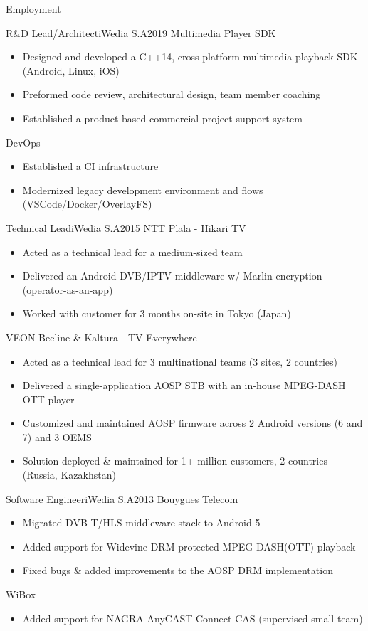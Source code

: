 \documentclass[]{mcdowellcv}
\begin{document}
\begin{cvsection}{Employment}
		\begin{cvsubsection}{R\&D Lead/Architect}{iWedia S.A}{2019}
			Multimedia Player SDK
			\begin{itemize}
				\item Designed and developed a C++14, cross-platform multimedia playback SDK (Android, Linux, iOS)
				\item Preformed code review, architectural design, team member coaching
				\item Established a product-based commercial project support system
			\end{itemize}
			DevOps
			\begin{itemize}
				\item Established a CI infrastructure
				\item Modernized legacy development environment and flows (VSCode/Docker/OverlayFS)
			\end{itemize}
		\end{cvsubsection}

		\begin{cvsubsection}{Technical Lead}{iWedia S.A}{2015}
			NTT Plala - Hikari TV
			\begin{itemize}
				\item Acted as a technical lead for a medium-sized team
				\item Delivered an Android DVB/IPTV middleware w/ Marlin encryption (operator-as-an-app)
				\item Worked with customer for 3 months on-site in Tokyo (Japan)
			\end{itemize}
			VEON Beeline \& Kaltura - TV Everywhere
			\begin{itemize}
				\item Acted as a technical lead for 3 multinational teams (3 sites, 2 countries)
				\item Delivered a single-application AOSP STB with an in-house MPEG-DASH OTT player
				\item Customized and maintained AOSP firmware across 2 Android versions (6 and 7) and 3 OEMS
				\item Solution deployed \& maintained for 1+ million customers, 2 countries (Russia, Kazakhstan)
			\end{itemize}
		\end{cvsubsection}

		\begin{cvsubsection}{Software Engineer}{iWedia S.A}{2013}
			Bouygues Telecom
			\begin{itemize}
				\item Migrated DVB-T/HLS middleware stack to Android 5
				\item Added support for Widevine DRM-protected MPEG-DASH(OTT) playback
				\item Fixed bugs \& added improvements to the AOSP DRM implementation
			\end{itemize}
			WiBox
			\begin{itemize}
				\item Added support for NAGRA AnyCAST Connect CAS (supervised small team)
			\end{itemize}
		\end{cvsubsection}


\end{cvsection}
\end{document}
